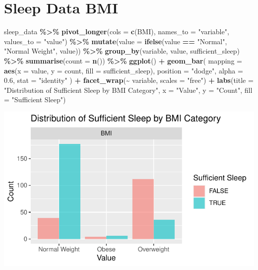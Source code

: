 \documentclass[
  11pt,
]{article}
\newenvironment{Shaded}{\begin{snugshade}}{\end{snugshade}}
\newcommand{\AttributeTok}[1]{\textcolor[rgb]{0.13,0.29,0.53}{#1}}
\newcommand{\FloatTok}[1]{\textcolor[rgb]{0.00,0.00,0.81}{#1}}
\newcommand{\FunctionTok}[1]{\textcolor[rgb]{0.13,0.29,0.53}{\textbf{#1}}}
\newcommand{\NormalTok}[1]{#1}
\newcommand{\SpecialCharTok}[1]{\textcolor[rgb]{0.81,0.36,0.00}{\textbf{#1}}}
\newcommand{\StringTok}[1]{\textcolor[rgb]{0.31,0.60,0.02}{#1}}
\begin{document}
\hypertarget{sleep-data-bmi}{%
\section{Sleep Data BMI}\label{sleep-data-bmi}}

\begin{Shaded}
\begin{Highlighting}[]
\NormalTok{sleep\_data }\SpecialCharTok{\%\textgreater{}\%}
  \FunctionTok{pivot\_longer}\NormalTok{(}\AttributeTok{cols =} \FunctionTok{c}\NormalTok{(BMI), }\AttributeTok{names\_to =} \StringTok{"variable"}\NormalTok{, }\AttributeTok{values\_to =} \StringTok{"value"}\NormalTok{) }\SpecialCharTok{\%\textgreater{}\%}
  \FunctionTok{mutate}\NormalTok{(}\AttributeTok{value =} \FunctionTok{ifelse}\NormalTok{(value }\SpecialCharTok{==} \StringTok{"Normal"}\NormalTok{, }\StringTok{"Normal Weight"}\NormalTok{, value)) }\SpecialCharTok{\%\textgreater{}\%}
  \FunctionTok{group\_by}\NormalTok{(variable, value, sufficient\_sleep) }\SpecialCharTok{\%\textgreater{}\%}
  \FunctionTok{summarise}\NormalTok{(}\AttributeTok{count =} \FunctionTok{n}\NormalTok{()) }\SpecialCharTok{\%\textgreater{}\%}
  \FunctionTok{ggplot}\NormalTok{() }\SpecialCharTok{+}
  \FunctionTok{geom\_bar}\NormalTok{(}
    \AttributeTok{mapping =} \FunctionTok{aes}\NormalTok{(}\AttributeTok{x =}\NormalTok{ value, }\AttributeTok{y =}\NormalTok{ count, }\AttributeTok{fill =}\NormalTok{ sufficient\_sleep),}
    \AttributeTok{position =} \StringTok{"dodge"}\NormalTok{,   }
    \AttributeTok{alpha =} \FloatTok{0.6}\NormalTok{,}
    \AttributeTok{stat =} \StringTok{"identity"}
\NormalTok{  ) }\SpecialCharTok{+}
  \FunctionTok{facet\_wrap}\NormalTok{(}\SpecialCharTok{\textasciitilde{}}\NormalTok{ variable, }\AttributeTok{scales =} \StringTok{"free"}\NormalTok{) }\SpecialCharTok{+}
  \FunctionTok{labs}\NormalTok{(}\AttributeTok{title =} \StringTok{"Distribution of Sufficient Sleep by BMI Category"}\NormalTok{,}
       \AttributeTok{x =} \StringTok{"Value"}\NormalTok{, }
       \AttributeTok{y =} \StringTok{"Count"}\NormalTok{, }
       \AttributeTok{fill =} \StringTok{"Sufficient Sleep"}\NormalTok{)}
\end{Highlighting}
\end{Shaded}

\begin{center}\includegraphics[width=0.7\linewidth]{SleepHelath_files/figure-latex/unnamed-chunk-9-1} \end{center}
\end{document}
